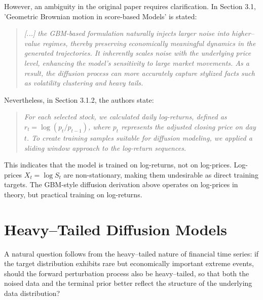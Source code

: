 However, an ambiguity in the original paper requires clarification. In Section 3.1, 'Geometric Brownian motion in score-based Models' is stated:
\begin{quote}
    \emph{[...] the GBM-based formulation naturally injects larger noise into higher--value regimes, thereby preserving economically meaningful dynamics in the generated trajectories. It inherently scales noise with the underlying price level, enhancing the model’s sensitivity to large market movements. As a result, the diffusion process can more accurately capture stylized facts such as volatility clustering and heavy tails.}
\end{quote}
Nevertheless, in Section 3.1.2, the authors state:
\begin{quote}
    \emph{For each selected stock, we calculated daily log-returns, defined 
    as \(r_t = \log(p_t / p_{t-1})\), where \(p_t\) represents the 
    adjusted closing price on day \(t\). To create training samples 
    suitable for diffusion modeling, we applied a sliding window approach 
    to the log-return sequences.}
\end{quote}
This indicates that the model is trained on log-returns, not on log-prices. 
Log-prices \(X_t = \log S_t\) are non-stationary, making them undesirable 
as direct training targets. The GBM-style diffusion derivation above 
operates on log-prices in theory, but practical training on log-returns.

\section{Heavy--Tailed Diffusion Models}

A natural question follows from the heavy--tailed nature of financial time series: if the target distribution exhibits rare but economically important extreme events, should the forward perturbation process also be heavy--tailed, so that both the noised data and the terminal prior better reflect the structure of the underlying data distribution?

